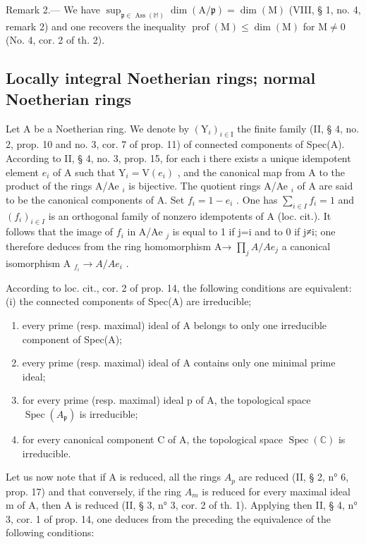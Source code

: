 Remark 2.--- We have \(\sup_{\mathfrak{p}\in\operatorname{Ass}(\mathbb{M})}\dim(\mathrm{A}/\mathfrak{p})=\dim(\mathrm{M})\) (VIII, § 1, no. 4, remark 2) and one recovers the inequality \(\operatorname{prof}(\mathrm{M})\leqslant\dim(\mathrm{M})\) for \(\mathrm{M}\neq0\) (No. 4, cor. 2 of th. 2).

\subsection{Locally integral Noetherian rings; normal Noetherian rings}

Let A be a Noetherian ring. We denote by \((\mathrm{Y}_{i})_{i\in\mathrm{I}}\) the finite family (II, § 4, no. 2, prop. 10 and no. 3, cor. 7 of prop. 11) of connected components of Spec(A). According to II, § 4, no. 3, prop. 15, for each i there exists a unique idempotent element \(e_{i}\) of A such that \(\mathrm{Y}_{i}=\mathrm{V}(e_{i})\) , and the canonical map from A to the product of the rings A/Ae \(_{i}\) is bijective. The quotient rings A/Ae \(_{i}\) of A are said to be the canonical components of A. Set \(f_{i}=1-e_{i}\) . One has \(\sum_{i\in I}f_{i}=1\) and \((f_{i})_{i\in I}\) is an orthogonal family of nonzero idempotents of A (loc. cit.). It follows that the image of \(f_{i}\) in A/Ae \(_{j}\) is equal to 1 if j=i and to 0 if j≠i; one therefore deduces from the ring homomorphism A→ \(\prod_{j}A/Ae_{j}\) a canonical isomorphism A \(_{f_{i}}\rightarrow A/Ae_{i}\) .

According to loc. cit., cor. 2 of prop. 14, the following conditions are equivalent: (i) the connected components of Spec(A) are irreducible;

\begin{enumerate}
\def\labelenumi{(\roman{enumi})}
\setcounter{enumi}{1}
\item
  every prime (resp. maximal) ideal of A belongs to only one irreducible component of Spec(A);
\item
  every prime (resp. maximal) ideal of A contains only one minimal prime ideal;
\item
  for every prime (resp. maximal) ideal p of A, the topological space \(\operatorname{Spec}(A_{\mathfrak{p}})\) is irreducible;
\item
  for every canonical component C of A, the topological space \(\operatorname{Spec}(\mathbb{C})\) is irreducible.
\end{enumerate}

Let us now note that if A is reduced, all the rings \(A_{p}\) are reduced (II, § 2, n° 6, prop. 17) and that conversely, if the ring \(A_{m}\) is reduced for every maximal ideal m of A, then A is reduced (II, § 3, n° 3, cor. 2 of th. 1). Applying then II, § 4, n° 3, cor. 1 of prop. 14, one deduces from the preceding the equivalence of the following conditions:

